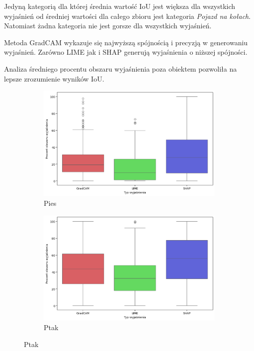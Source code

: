Jedyną kategorią dla której średnia wartość IoU jest większa dla wszystkich wyjaśnień od średniej wartości dla całego zbioru jest kategoria \textit{Pojazd na kołach}.
Natomiast żadna kategoria nie jest gorsze dla wszystkich wyjaśnień.

Metoda GradCAM wykazuje się najwyższą spójnością i precyzją w generowaniu wyjaśnień.
Zarówno LIME jak i SHAP generują wyjaśnienia o niższej spójności.

\vspace{1cm}

Analiza średniego procentu obszaru wyjaśnienia poza obiektem pozwoliła na lepsze zrozumienie wyników IoU.

\begin{figure}[h]
	\centering
	\begin{subfigure}[b]{0.3\textwidth}
		\centering\includegraphics[width=.9\textwidth]{img/areaincorrect_dog}
		\caption{Pies}
	\end{subfigure}
	\begin{subfigure}[b]{0.3\textwidth}
		\centering\includegraphics[width=.9\textwidth]{img/areaincorrect_bird}
		\caption{Ptak}
	\end{subfigure}

\end{figure}
